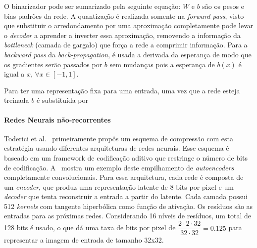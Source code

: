 O binarizador pode ser sumarizado pela seguinte equação: $W$ e $b$ são os pesos e bias padrões da rede. A quantização é realizada somente na \textit{forward pass}, visto que substituir o arredondamento por uma aproximação completamente pode levar o \textit{decoder} a aprender a inverter essa aproximação, removendo a informação da \textit{bottleneck} (camada de gargalo) que força a rede a comprimir informação. Para a \textit{backward pass} da \textit{back-propagation}, é usada a derivada da esperança de modo que os gradientes serão passados por $b$ sem mudanças pois a esperança de $b(x)$ é igual a $x, \, \forall x \in [-1, 1]$. 

Para ter uma representação fixa para uma entrada, uma vez que a rede esteja treinada $b$ é substituída por 
\paragraph{Redes Neurais não-recorrentes\\}

Toderici et al.~\cite{toderici2016} primeiramente propôs um esquema de compressão com esta estratégia usando diferentes arquiteturas de redes neurais. Esse esquema é baseado em um framework de codificação aditivo que restringe o número de bits de codificação. A~ mostra um exemplo deste empilhamento de \textit{autoencoders} completamente convolucionais. Para essa arquitetura, cada rede é composta de um \textit{encoder}, que produz uma representação latente de 8 bits por pixel e um \textit{decoder} que tenta reconstruir a entrada a partir do latente. Cada camada possui 512 \textit{kernels} com tangente hiperbólica como função de ativação. Os resíduos são as entradas para as próximas redes. Considerando 16 níveis de resíduos, um total de 128 bits é usado, o que dá uma taxa de bits por pixel de $\dfrac{2 \cdot 2 \cdot 32}{32 \cdot 32} = 0.125$ para representar a imagem de entrada de tamanho 32x32. 


